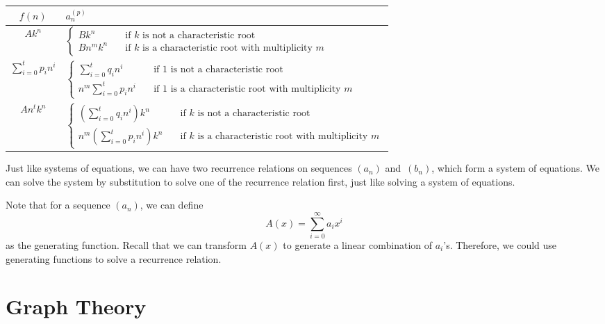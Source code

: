 \documentclass[math]{amznotes}
\theoremstyle{remark}
\newcommand{\0}{\mathbf{0}}
\newcommand{\1}{\mathbf{1}}
\begin{document}
\begin{center}
    \begin{tabular}{|c|l|}
        \hline
        $f(n)$ &  $a_n^{(p)}$ \\
        \hline
        $Ak^n$ & $\begin{cases}
            Bk^n & \quad\textrm{if } k \textrm{ is not a characteristic root} \\
            Bn^mk^n & \quad\textrm{if } k \textrm{ is a characteristic root with multiplicity } m
        \end{cases}$ \\
        \hline
        $\sum_{i = 0}^{t}p_in^i$ & $\begin{cases}
            \sum_{i = 0}^{t}q_in^i & \quad\textrm{if } 1 \textrm{ is not a characteristic root} \\
            n^m\sum_{i = 0}^{t}p_in^i & \quad\textrm{if } 1 \textrm{ is a characteristic root with multiplicity } m
        \end{cases}$ \\
        \hline
        $An^tk^n$ & $\begin{cases}
            \left(\sum_{i = 0}^{t}q_in^i\right)k^n & \quad\textrm{if } k \textrm{ is not a characteristic root} \\
            n^m\left(\sum_{i = 0}^{t}p_in^i\right)k^n & \quad\textrm{if } k \textrm{ is a characteristic root with multiplicity } m
        \end{cases}$ \\
        \hline
    \end{tabular}
\end{center}
Just like systems of equations, we can have two recurrence relations on sequences $(a_n)$ and~$(b_n)$, which form a system of equations. We can solve the system by substitution to solve one of the recurrence relation first, just like solving a system of equations.

Note that for a sequence $(a_n)$, we can define
\begin{equation*}
    A(x) = \sum_{i = 0}^{\infty}a_ix^i
\end{equation*}
as the generating function. Recall that we can transform $A(x)$ to generate a linear combination of $a_i$'s. Therefore, we could use generating functions to solve a recurrence relation.

\chapter{Graph Theory}
\end{document}
